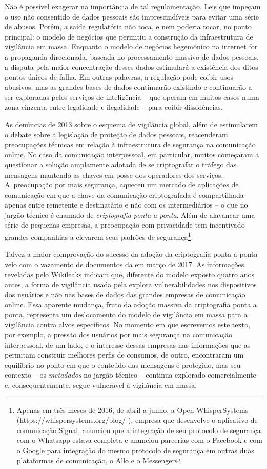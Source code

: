 Não é possível exagerar na importância de tal regulamentação. Leis que
impeçam o uso não consentido de dados pessoais são imprescindíveis para
evitar uma série de abusos. Porém, a saída regulatória não toca, e nem
poderia tocar, no ponto principal: o modelo de negócios que permitiu a
construção da infraestrutura de vigilância em massa. Enquanto o modelo
de negócios hegemônico na internet for a propaganda direcionada, baseada
no processamento massivo de dados pessoais, a disputa pela maior
concentração desses dados estimulará a existência dos ditos pontos
únicos de falha. Em outras palavras, a regulação pode coibir usos
abusivos, mas as grandes bases de dados continuarão existindo e
continuarão a ser exploradas pelos serviços de inteligência -- que operam
em muitos casos numa zona cinzenta entre legalidade e ilegalidade -- para
coibir dissidências.

As denúncias de 2013 sobre o esquema de vigilância global, além de
estimularem o debate sobre a legislação de proteção de dados pessoais,
reacenderam preocupações técnicas em relação à infraestrutura de
segurança na comunicação online. No caso da comunicação interpessoal, em
particular, muitos começaram a questĩonar a solução amplamente adotada
de se criptografar o tráfego das mensagens mantendo as chaves em posse
dos operadores dos serviços. A~preocupação por mais segurança, aqueceu
um mercado de aplicações de comunicação em que a chave da comunicação
criptografada é compartilhada apenas entre remetente e destinatário e
não com os intermediários -- o que no jargão técnico é chamado de
\emph{criptografia ponta a ponta}. Além de alavancar uma série de
pequenas empresas, a preocupação com privacidade tem incentivado grandes
companhias a elevarem seus padrões de segurança\footnote{Apenas
  em três meses de 2016, de abril a junho, a Open WhisperSystems
  (https://whispersystems.org/blog/ ), empresa que desenvolve o
  aplicativo de comunicação Signal, anunciou que a integração de seu
  protocolo de segurança com o Whatsapp estava completa e anunciou
  parcerias com o Facebook e com o Google para integração do mesmo
  protocolo de segurança em outras duas plataformas de comunicação, o
  Allo e o Messenger }.

Talvez a maior comprovação do sucesso da adoção da criptografia ponta a
ponta veio com o vazamento de documentos da  em março de 2017. As
informações reveladas pelo Wikileaks indicam que, diferente do modelo
exposto quatro anos antes, a forma de vigilância usada pela  explora
vulnerabilidades nos dispositivos dos usuários e não nas bases de dados
das grandes empresas de comunicação online. Essa aparente mudança, fruto
da adoção massiva da criptografia ponta a ponta, representa um
deslocamento do modelo de vigilância em massa para a vigilância contra
alvos específicos. No momento em que escrevemos este texto, por exemplo,
a pressão dos usuários por mais segurança na comunicação interpessoal,
de um lado, e o interesse dessas empresas nas informações que as
permitam construir melhores perfis de consumos, de outro, encontraram um
equilíbrio no ponto em que o conteúdo das mensagens é protegido, mas seu
contexto -- os \emph{metadados} no jargão técnico -- continua explorado
comercialmente e, consequentemente, segue vulnerável à vigilância em
massa.

